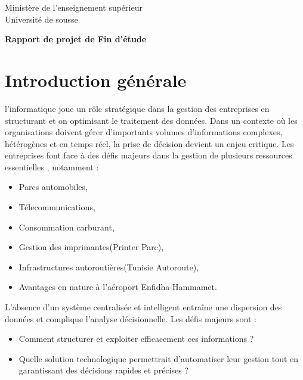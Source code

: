 \documentclass[a4paper,11pt]{report}
\begin{document}

	\begin{titlepage}
		\begin{center}
		{\large Ministère de l'enseignement supérieur } \\
		{\large Université de sousse} \\ 
		\vspace{2cm}
	
		{ \huge \textbf{Rapport de projet de Fin d'étude }}
		\end{center}	
	
	\end{titlepage}

\newpage 
\section*{ Introduction générale}
l'informatique joue un rôle stratégique dans la gestion des entreprises en structurant et on optimisant le traitement des données. Dans un contexte où les organisations doivent gérer d'importants volumes d'informations complexes, hétérogènes et en temps réel, la prise de décision devient un enjeu critique.
\newline
Les entreprises font face à des défis majeurs dans la gestion de plusieurs ressources essentielles , notamment : 
\begin{itemize}
	\item Parcs automobiles,
	\item Télecommunications,
	\item Consommation carburant,
	\item Gestion des imprimantes(Printer Parc),
	\item Infrastructures autoroutières(Tunisie Autoroute),
	\item Avantages en nature à l'aéroport Enfidha-Hammamet.
\end{itemize}
L'absence d'un système centralisée et intelligent entraîne une dispersion des données et complique l'analyse décisionnelle. Les défis majeurs sont :
\begin{itemize}
	\item Comment structurer et exploiter efficacement ces informations ?
	\item Quelle solution technologique permettrait d'automatiser leur gestion tout en garantissant des décisions rapides et précises ?
\end{itemize}
\end{document}
